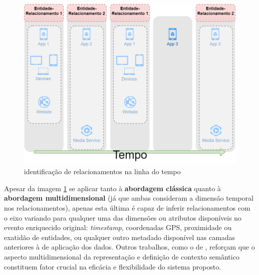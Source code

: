 \newpage

\begin{figure}[h]
\caption{identificação de relacionamentos na linha do tempo}
\label{i:DataChannels}
\centering
\includegraphics[width=1.0\textwidth,height=1.0\textheight,keepaspectratio]{images/DataChannels-2.png}
\end{figure}

Apesar da imagem \ref{i:DataChannels} se aplicar tanto à \textbf{abordagem clássica} quanto à \textbf{abordagem multidimensional} (já que ambas consideram a dimensão temporal nos relacionamentos), apenas esta última é capaz de inferir relacionamentos com o eixo variando para qualquer uma das dimensões ou atributos disponíveis no evento enriquecido original: \textit{timestamp}, coordenadas GPS, proximidade ou exatidão de entidades, ou qualquer outro metadado disponível nas camadas anteriores à de aplicação dos dados. Outros trabalhos, como o de , reforçam que o aspecto multidimensional da representação e definição de contexto semântico constituem fator crucial na eficácia e flexibilidade do sistema proposto.
